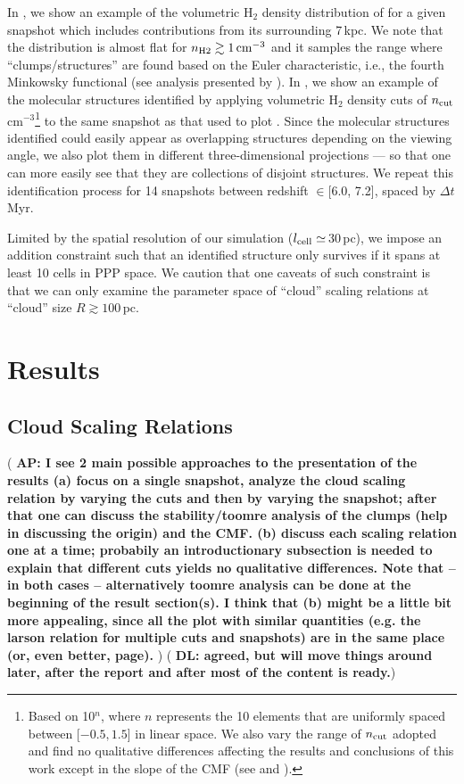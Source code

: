 \documentclass[iop]{emulateapj} %
\newcommand{\AP}[1]{({\bf \color{apcolor} AP: #1})}
\newcommand{\DL}[1]{({\bf \color{dlcolor} DL: #1})}
\begin{document}
In , we show an example of the volumetric H$_2$ density distribution of \flower
for a given snapshot which includes contributions from its surrounding 7\,kpc.
We note that the distribution is almost flat for $n_{\rm H2}\gtrsim1\,{\rm cm}^{-3}$ and it samples the range where ``clumps/structures'' are 
found based on the Euler characteristic, i.e., the fourth Minkowsky functional (see analysis presented by \citealt{Pallottini17b}).
In , we show an example of the molecular structures identified by applying volumetric H$_2$ density cuts of 
$n_{\rm cut}$\eq[0.32, 0.53, 0.88, 1.45, 2.45, 4.08, 6.81, 11.36, 19.00, 31.62]\,cm$^{-3}$\footnote{Based on 10$^n$, where $n$ represents the 10 elements that are uniformly spaced between [$-0.5, 1.5$] in linear space.
We also vary the range of
$n_{\rm cut}$ adopted and find no qualitative differences
affecting the results and conclusions of this work except in the slope of the CMF (see  and ).}
to the same snapshot as that
used to plot .
Since the molecular structures identified could
easily appear as overlapping structures depending on the viewing angle, we
also plot them in different three-dimensional projections --- so that one can more
easily see that they are collections of disjoint structures.
We repeat this identification process for 14 snapshots between
redshift \z$\in$[6.0, 7.2], spaced by $\Delta t$\,Myr.


Limited by the spatial resolution of our simulation ($l_{\rm cell}\simeq$\,30\,pc), we impose an addition constraint such that an identified structure only survives if it spans at least 10 cells in PPP space. We caution that one caveats of such constraint is that we can only examine the parameter space of ``cloud'' scaling relations at ``cloud'' size $R\gtrsim100$\,pc.


\section{Results}     \label{sec:results}


\subsection{Cloud Scaling Relations}

\AP{I see 2 main possible approaches to the presentation of the results
%
(a) focus on a single snapshot, analyze the cloud scaling relation by varying the cuts and then by varying the snapshot; after that one can discuss the stability/toomre analysis of the clumps (help in discussing the origin) and the CMF.
%
(b) discuss each scaling relation one at a time; probabily an introductionary subsection is needed to explain that different cuts yields no qualitative differences.
%
Note that -- in both cases -- alternatively toomre analysis can be done at the beginning of the result section(s).
%
I think that (b) might be a little bit more appealing, since all the plot with similar quantities (e.g. the larson relation for multiple cuts and snapshots) are in the same place (or, even better, page).
}
\DL{agreed, but will move things around later, after the report and after most of the content is ready.}
\end{document}
